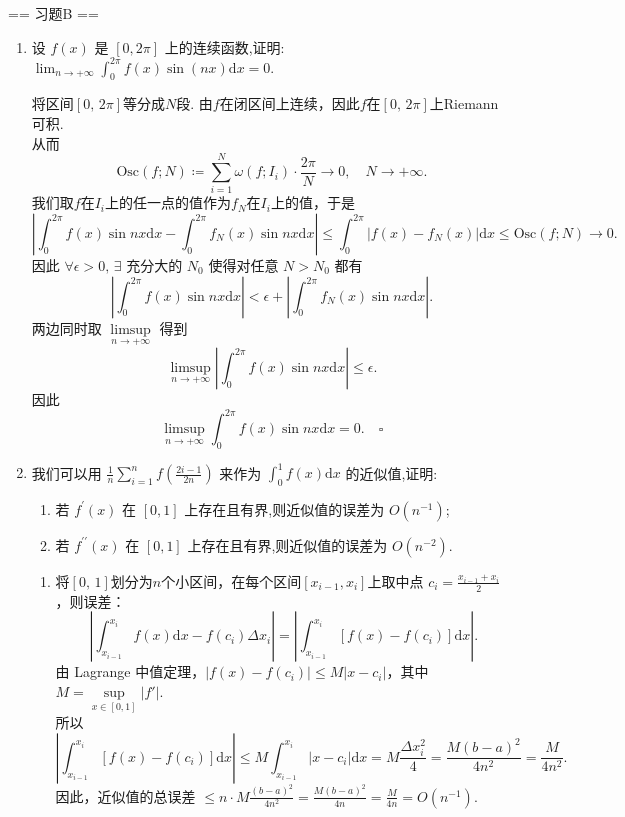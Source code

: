 == 习题B ==
\begin{enumerate}
    \item[1.]设 \(f(x)\) 是 \([0,2\pi ]\) 上的连续函数,证明: \(\displaystyle\lim_{n\to +\infty}\int_{0}^{2\pi}f(x)\sin (nx)\mathrm{d}x = 0.\)
    \begin{solution}
        将区间$[0,\,2\pi]$等分成$N$段. 由$f$在闭区间上连续，因此$f$在$[0,\,2\pi]$上Riemann可积.\\
        从而
        \[
        \mathrm{Osc}(f;N)\coloneqq \sum_{i=1}^{N}\omega(f;I_{i})\cdot\frac{2\pi}{N}\rightarrow 0,\quad N\to +\infty.
        \]
        我们取$f$在$I_{i}$上的任一点的值作为$f_{N}$在$I_{i}$上的值，于是
        \[
        \left|\int_{0}^{2\pi}f(x)\sin{nx}\mathrm{d}x-\int_{0}^{2\pi}f_{N}(x)\sin{nx}\mathrm{d}x\right|\leq \int_{0}^{2\pi}\left|f(x)-f_{N}(x)\right|\mathrm{d}x\leq \mathrm{Osc}(f;N)\to 0.
        \]
        因此 $\forall \epsilon>0,\,\exists$ 充分大的 $N_{0}$ 使得对任意 $N>N_{0}$ 都有
        \[
        \left|\int_{0}^{2\pi}f(x)\sin{nx}\mathrm{d}x\right|<\epsilon+\left|\int_{0}^{2\pi}f_{N}(x)\sin{nx}\mathrm{d}x\right|.
        \]
        两边同时取 $\underset{n\to+\infty}{\limsup}$ 得到
        \[
        \limsup_{n\to+\infty}\left|\int_{0}^{2\pi}f(x)\sin{nx}\mathrm{d}x\right|\leq \epsilon.
        \]
        因此
        \[
        \limsup_{n\to+\infty}\int_{0}^{2\pi}f(x)\sin{nx}\mathrm{d}x=0. \quad\square
        \]
    \end{solution}

    \item[2.]我们可以用 \(\displaystyle\frac{1}{n}\sum_{i = 1}^{n}f\left(\frac{2i - 1}{2n}\right)\) 来作为 \(\displaystyle\int_{0}^{1}f(x)\mathrm{d}x\) 的近似值,证明:
    \begin{enumerate}
        \item[(a)]若 \(\displaystyle f^{\prime}(x)\) 在 $[0,1]$ 上存在且有界,则近似值的误差为 \(\displaystyle O(n^{-1})\);
        \item[(b)]若 \(\displaystyle f^{\prime \prime}(x)\) 在 $[0,1]$ 上存在且有界,则近似值的误差为 \(\displaystyle O(n^{-2})\).
    \end{enumerate}
    \begin{solution}
        \begin{enumerate}
        \item[(a)]
        将$[0,\,1]$划分为$n$个小区间，在每个区间$[x_{i-1}, x_i]$上取中点 $\displaystyle c_i = \frac{x_{i-1}+x_i}{2}$，则误差：
        \[
        \left|\int_{x_{i-1}}^{x_i} f(x) \mathrm{d}x - f(c_i) \Delta x_i\right| = \left|\int_{x_{i-1}}^{x_i} [f(x)-f(c_i)] \mathrm{d}x\right|.
        \]
        由 Lagrange 中值定理，$|f(x)-f(c_i)| \leq M |x-c_i|$，其中$M=\underset{x\in[0,1]}{\sup}|f'|$.\\
        所以
        \[
        \left|\int_{x_{i-1}}^{x_i} [f(x)-f(c_i)] \mathrm{d}x\right| \leq M \int_{x_{i-1}}^{x_i} |x-c_i| \mathrm{d}x = M \frac{\Delta x_i^2}{4}=\frac{M(b-a)^2}{4n^2}=\frac{M}{4n^2}.
        \]
        因此，近似值的总误差 $\displaystyle\leq n \cdot M \frac{(b-a)^2}{4n^2} = \frac{M(b-a)^2}{4n} =\frac{M}{4n}=O(n^{-1})$. 


\end{enumerate}
\end{solution}
\end{enumerate}
